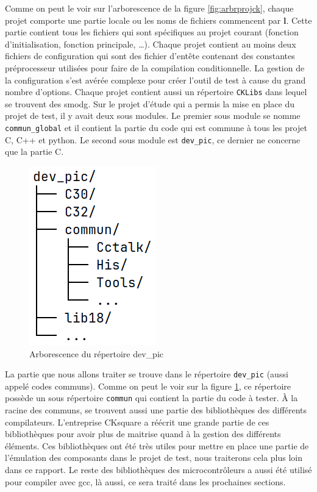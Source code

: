 \documentclass[a4paper]{article}
\begin{document}
Comme on peut le voir sur l'arborescence de la figure \ref{fig:arbrprojck},
chaque projet comporte une partie locale ou les noms de fichiers commencent par
\textbf{l}. Cette partie contient tous les fichiers qui sont spécifiques au
projet courant (fonction d'initialisation, fonction principale, \dots). Chaque
projet contient au moins deux fichiers de configuration qui sont des fichier
d'entête contenant des constantes préprocesseur utilisées pour faire de la
compilation conditionnelle. La gestion de la configuration s'est avérée complexe
pour créer l'outil de test à cause du grand nombre d'options. Chaque projet
contient aussi un répertoire \verb|CKLibs| dans lequel se trouvent des
\gls{smodg}. Sur le projet d'étude qui a permis la mise en place du projet de
test, il y avait deux sous modules. Le premier sous module se nomme
\verb|commun_global| et il contient la partie du code qui est commune à tous les
projet C, C++ et python. Le second sous module est \verb|dev_pic|, ce dernier ne
concerne que la partie C.

\begin{figure}[h!]
  \begin{center}
    \includegraphics[scale=0.5]{./img/arborescence-devpic.png}
    \caption{Arborescence du répertoire dev\_pic}
    \label{fig:repdevpic}
  \end{center}
\end{figure}

La partie que nous allons traiter se trouve dans le répertoire \verb|dev_pic|
(aussi appelé codes communs). Comme on peut le voir sur la figure
\ref{fig:repdevpic}, ce répertoire possède un sous répertoire \verb|commun| qui
contient la partie du code à tester. À la racine des communs, se trouvent aussi
une partie des bibliothèques des différents compilateurs. L'entreprise CKsquare
a réécrit une grande partie de ces bibliothèques pour avoir plus de maitrise
quand à la gestion des différents éléments. Ces bibliothèques ont été très
utiles pour mettre en place une partie de l'émulation des composants dans le
projet de test, nous traiterons cela plus loin dans ce rapport. Le reste des
bibliothèques des microcontrôleurs a aussi été utilisé pour compiler avec gcc,
là aussi, ce sera traité dans les prochaines sections.
\end{document}
